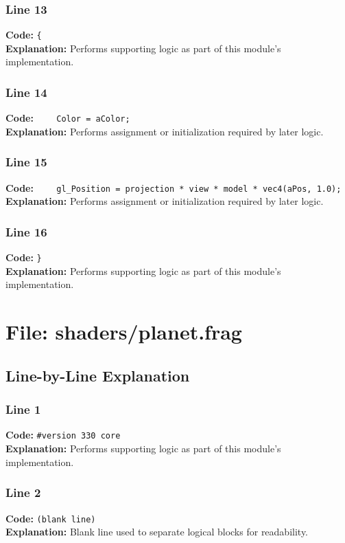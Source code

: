 \documentclass[11pt,a4paper]{article}
\begin{document}
\subsubsection*{Line 13}
\textbf{Code:} \verb|{|\\
\textbf{Explanation:} Performs supporting logic as part of this module's implementation.

\subsubsection*{Line 14}
\textbf{Code:} \verb|    Color = aColor;|\\
\textbf{Explanation:} Performs assignment or initialization required by later logic.

\subsubsection*{Line 15}
\textbf{Code:} \verb|    gl_Position = projection * view * model * vec4(aPos, 1.0);|\\
\textbf{Explanation:} Performs assignment or initialization required by later logic.

\subsubsection*{Line 16}
\textbf{Code:} \verb|}|\\
\textbf{Explanation:} Performs supporting logic as part of this module's implementation.

\newpage
\section{File: shaders/planet.frag}
\subsection{Line-by-Line Explanation}
\subsubsection*{Line 1}
\textbf{Code:} \verb|#version 330 core|\\
\textbf{Explanation:} Performs supporting logic as part of this module's implementation.

\subsubsection*{Line 2}
\textbf{Code:} \texttt{(blank line)}\\
\textbf{Explanation:} Blank line used to separate logical blocks for readability.
\end{document}
